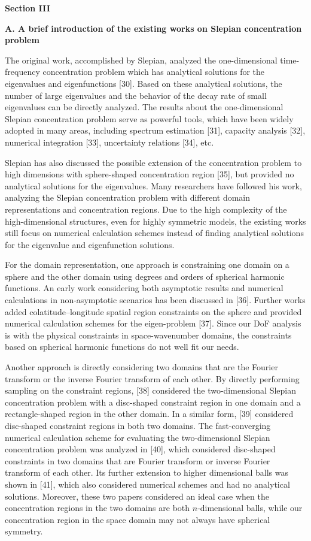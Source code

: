 \documentclass[a4paper,12pt]{article}
\begin{document}
\begin{framed}
	{\bf Section III}
	
	{\bf {\color{red} A. A brief introduction of the existing works on Slepian concentration problem}}
	
	{\color{red}
		\quad The original work, accomplished by Slepian, analyzed the one-dimensional time-frequency concentration problem which has analytical solutions for the eigenvalues and eigenfunctions [30]. Based on these analytical solutions, the number of large eigenvalues and the behavior of the decay rate of small eigenvalues can be directly analyzed. The results about the one-dimensional Slepian concentration problem serve as powerful tools, which have been widely adopted in many areas, including spectrum estimation [31], capacity analysis [32], numerical integration [33], uncertainty relations [34], etc.
		
		\quad Slepian has also discussed the possible extension of the concentration problem to high dimensions with sphere-shaped concentration region [35], but provided no analytical solutions for the eigenvalues. Many researchers have followed his work, analyzing the Slepian concentration problem with different domain representations and concentration regions. Due to the high complexity of the high-dimensional structures, even for highly symmetric models, the existing works still focus on numerical calculation schemes instead of finding analytical solutions for the eigenvalue and eigenfunction solutions. 
		
		\quad For the domain representation, one approach is constraining one domain on a sphere and the other domain using degrees and orders of spherical harmonic functions. An early work considering both asymptotic results and numerical calculations in non-asymptotic scenarios has been discussed in [36]. Further works added colatitude–longitude spatial region constraints on the sphere and provided numerical calculation schemes for the eigen-problem [37]. Since our DoF analysis is with the physical constraints in space-wavenumber domains, the constraints based on spherical harmonic functions do not well fit our needs. 
		
		\quad Another approach is directly considering two domains that are the Fourier transform or the inverse Fourier transform of each other. By directly performing sampling on the constraint regions, [38] considered the two-dimensional Slepian concentration problem with a disc-shaped constraint region in one domain and a rectangle-shaped region in the other domain. In a similar form, [39] considered disc-shaped constraint regions in both two domains. 
		The fast-converging numerical calculation scheme for evaluating the two-dimensional Slepian concentration problem was analyzed in [40], which considered disc-shaped constraints in two domains that are Fourier transform or inverse Fourier transform of each other. 
		Its further extension to higher dimensional balls was shown in [41], which also considered numerical schemes and had no analytical solutions. Moreover, these two papers considered an ideal case when the concentration regions in the two domains are both $n$-dimensional balls, while our concentration region in the space domain may not always have spherical symmetry. 
		
}
\end{framed}
\end{document}
